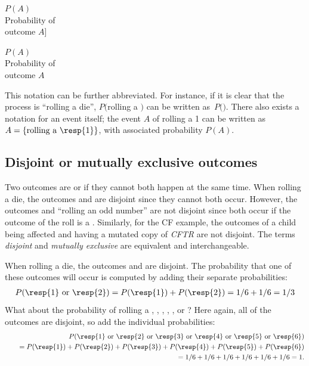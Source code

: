 $P(A)$\vspace{1mm}\\\footnotesize Probability of\\outcome $A$]{\raggedright\vspace{-13mm}

$P(A)$\vspace{1mm}\\\footnotesize Probability of\\outcome $A$}This notation can be further abbreviated. For instance, if it is clear that the process is ``rolling a die'', $P($rolling a $)$ can be written as~$P($$)$.  There also exists a notation for an event itself; the event $A$ of rolling a 1 can be written as $A = \{\text{rolling a \resp{1}}\}$, with associated probability $P(A)$. 


\subsection{Disjoint or mutually exclusive outcomes}


Two outcomes are  or  if they cannot both happen at the same time. When rolling a die, the outcomes  and  are disjoint since they cannot both occur.  However, the outcomes  and ``rolling an odd number'' are not disjoint since both occur if the outcome of the roll is a . Similarly, for the CF example, the outcomes of a child being affected and having a mutated copy of \textit{CFTR} are not disjoint. The terms \emph{disjoint} and \emph{mutually exclusive} are equivalent and interchangeable. 

When rolling a die, the outcomes  and  are disjoint. The probability that one of these outcomes will occur is computed by adding their separate probabilities:
\begin{eqnarray*}
P(\text{\resp{1} or \resp{2}}) = P(\text{\resp{1}})+P(\text{\resp{2}}) = 1/6 + 1/6 = 1/3
\end{eqnarray*}
What about  the probability of rolling a , , , , , or ? Here again, all of the outcomes are disjoint, so add the individual probabilities:
\begin{eqnarray*}
&&P(\text{\resp{1} or \resp{2} or \resp{3} or \resp{4} or \resp{5} or \resp{6}}) \\
	&&\quad= P(\text{\resp{1}})+P(\text{\resp{2}})+P(\text{\resp{3}})+P(\text{\resp{4}})+P(\text{\resp{5}})+P(\text{\resp{6}}) \\
	&&\quad= 1/6 + 1/6 + 1/6 + 1/6 + 1/6 + 1/6 = 1.
\end{eqnarray*}


